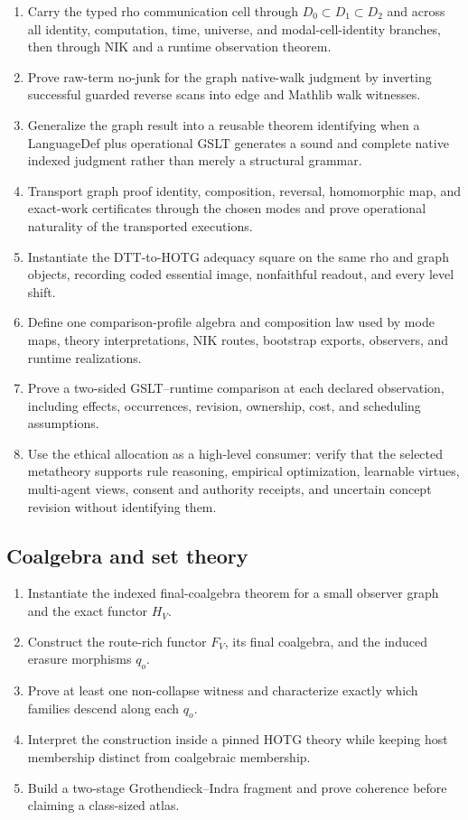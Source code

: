 \documentclass[11pt]{article}
\theoremstyle{definition}
\theoremstyle{remark}
\begin{document}
\begin{enumerate}
\item Carry the typed rho communication cell through $D_0\subset D_1\subset
  D_2$ and across all identity, computation, time, universe, and
  modal-cell-identity branches, then through NIK and a runtime observation
  theorem.
\item Prove raw-term no-junk for the graph native-walk judgment by inverting
  successful guarded reverse scans into edge and Mathlib walk witnesses.
\item Generalize the graph result into a reusable theorem identifying when a
  LanguageDef plus operational GSLT generates a sound and complete native
  indexed judgment rather than merely a structural grammar.
\item Transport graph proof identity, composition, reversal, homomorphic map,
  and exact-work certificates through the chosen modes and prove operational
  naturality of the transported executions.
\item Instantiate the DTT-to-HOTG adequacy square on the same rho and graph
  objects, recording coded essential image, nonfaithful readout, and every level
  shift.
\item Define one comparison-profile algebra and composition law used by mode
  maps, theory interpretations, NIK routes, bootstrap exports, observers, and
  runtime realizations.
\item Prove a two-sided GSLT--runtime comparison at each declared observation,
  including effects, occurrences, revision, ownership, cost, and scheduling
  assumptions.
\item Use the ethical allocation as a high-level consumer: verify that the
  selected metatheory supports rule reasoning, empirical optimization,
  learnable virtues, multi-agent views, consent and authority receipts, and
  uncertain concept revision without identifying them.
\end{enumerate}

\subsection{Coalgebra and set theory}

\begin{enumerate}
\item Instantiate the indexed final-coalgebra theorem for a small observer graph
  and the exact functor $H_V$.
\item Construct the route-rich functor $F_V$, its final coalgebra, and the induced
  erasure morphisms $q_o$.
\item Prove at least one non-collapse witness and characterize exactly which
  families descend along each $q_o$.
\item Interpret the construction inside a pinned HOTG theory while keeping
  host membership distinct from coalgebraic membership.
\item Build a two-stage Grothendieck--Indra fragment and prove coherence before
  claiming a class-sized atlas.
\end{enumerate}
\end{document}
